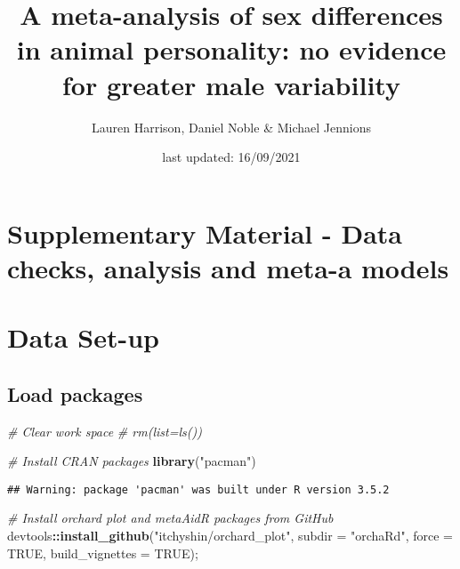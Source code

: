 \documentclass[]{article}
\title{A meta-analysis of sex differences in animal personality: no evidence
for greater male variability}
\author{Lauren Harrison, Daniel Noble \& Michael Jennions}
\date{last updated: 16/09/2021}
\newenvironment{Shaded}{\begin{snugshade}}{\end{snugshade}}
\newcommand{\KeywordTok}[1]{\textcolor[rgb]{0.13,0.29,0.53}{\textbf{#1}}}
\newcommand{\DataTypeTok}[1]{\textcolor[rgb]{0.13,0.29,0.53}{#1}}
\newcommand{\StringTok}[1]{\textcolor[rgb]{0.31,0.60,0.02}{#1}}
\newcommand{\CommentTok}[1]{\textcolor[rgb]{0.56,0.35,0.01}{\textit{#1}}}
\newcommand{\OtherTok}[1]{\textcolor[rgb]{0.56,0.35,0.01}{#1}}
\newcommand{\OperatorTok}[1]{\textcolor[rgb]{0.81,0.36,0.00}{\textbf{#1}}}
\newcommand{\NormalTok}[1]{#1}
\begin{document}
\maketitle

{
\setcounter{tocdepth}{2}
\tableofcontents
}
\section{Supplementary Material - Data checks, analysis and meta-a
models}\label{supplementary-material---data-checks-analysis-and-meta-a-models}

\section{Data Set-up}\label{data-set-up}

\subsection{Load packages}\label{load-packages}

\begin{Shaded}
\begin{Highlighting}[]
\CommentTok{# Clear work space}
  \CommentTok{# rm(list=ls())}

\CommentTok{# Install CRAN packages}
  \KeywordTok{library}\NormalTok{(}\StringTok{"pacman"}\NormalTok{)}
\end{Highlighting}
\end{Shaded}

\begin{verbatim}
## Warning: package 'pacman' was built under R version 3.5.2
\end{verbatim}

\begin{Shaded}
\begin{Highlighting}[]
\CommentTok{# Install orchard plot and metaAidR packages from GitHub}
\NormalTok{  devtools}\OperatorTok{::}\KeywordTok{install_github}\NormalTok{(}\StringTok{"itchyshin/orchard_plot"}\NormalTok{, }\DataTypeTok{subdir =} \StringTok{"orchaRd"}\NormalTok{, }\DataTypeTok{force =} \OtherTok{TRUE}\NormalTok{, }\DataTypeTok{build_vignettes =} \OtherTok{TRUE}\NormalTok{); }
\end{Highlighting}
\end{Shaded}
\end{document}
